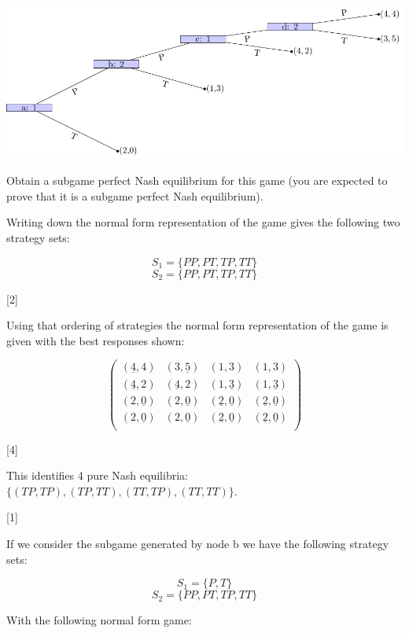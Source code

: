 \documentclass[12pt,a4paper]{article}
\begin{document}
\begin{enumerate}
\begin{enumerate}
            \begin{center}
                \includegraphics[width=.8\textwidth]{images/mock-img01.pdf}
            \end{center}

            Obtain a subgame perfect Nash equilibrium for this game (you are expected to prove that it is a subgame perfect Nash equilibrium).

            Writing down the normal form representation of the game gives the following two strategy sets:

            \[S_1=\{PP,PT,TP,TT\}\]
            \[S_2=\{PP,PT,TP,TT\}\]

            \hfill[2]

            Using that ordering of strategies the normal form representation of the game is given with the best responses shown:

            \[\begin{pmatrix}
            (\underline{4},4)&(3,\underline{5})&(1,3)&(1,3)\\
            (\underline{4},2)&(\underline{4},2)&(1,\underline{3})&(1,\underline{3})\\
            (2,\underline{0})&(2,\underline{0})&(\underline{2},\underline{0})&(\underline{2},\underline{0})\\
            (2,\underline{0})&(2,\underline{0})&(\underline{2},\underline{0})&(\underline{2},\underline{0})\\
            \end{pmatrix}\]

            \hfill[4]

            This identifies 4 pure Nash equilibria: \(\{(TP,TP),(TP,TT),(TT,TP),(TT,TT)\}\).

            \hfill[1]

            If we consider the subgame generated by node b we have the following strategy sets:

            \[S_1=\{P,T\}\]
            \[S_2=\{PP,PT,TP,TT\}\]

            With the following normal form game:


\end{enumerate}
\end{enumerate}
\end{document}
